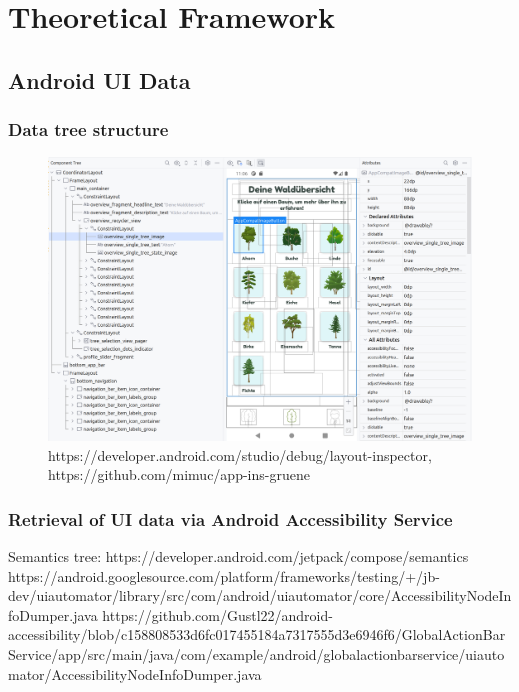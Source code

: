 \chapter{Theoretical Framework}

\section{Android UI Data}
\subsection{Data tree structure}

\begin{figure}
    \centering
    \includegraphics[width=\textwidth]{graphics/android_layout_inspector}
    \caption{https://developer.android.com/studio/debug/layout-inspector, https://github.com/mimuc/app-ins-gruene}
    \label{fig:android_layout_inspector}
\end{figure}

\subsection{Retrieval of UI data via Android Accessibility Service}

Semantics tree:
https://developer.android.com/jetpack/compose/semantics
https://android.googlesource.com/platform/frameworks/testing/+/jb-dev/uiautomator/library/src/com/android/uiautomator/core/AccessibilityNodeInfoDumper.java
https://github.com/Gustl22/android-accessibility/blob/c158808533d6fc017455184a7317555d3e6946f6/GlobalActionBarService/app/src/main/java/com/example/android/globalactionbarservice/uiautomator/AccessibilityNodeInfoDumper.java

